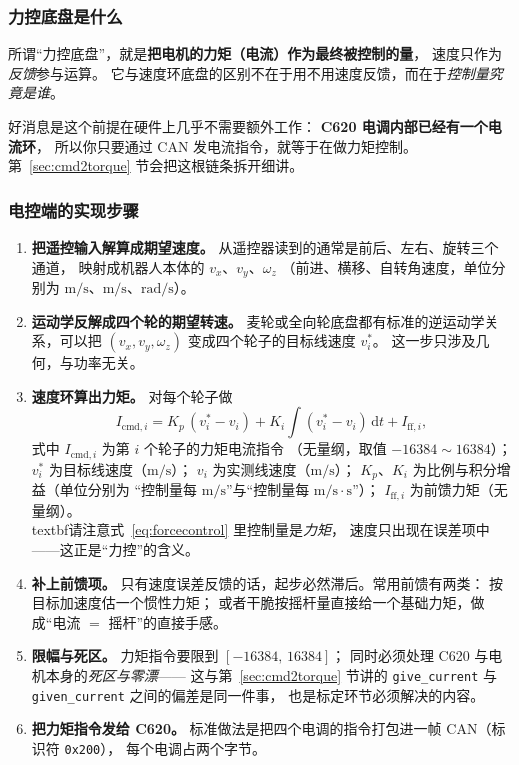 \documentclass[cn,blue,11pt,device=normal]{elegantnote}
\begin{document}
\subsubsection{力控底盘是什么}

所谓“力控底盘”，就是\textbf{把电机的力矩（电流）作为最终被控制的量}，
速度只作为\emph{反馈}参与运算。
它与速度环底盘的区别不在于用不用速度反馈，而在于\emph{控制量究竟是谁}。

好消息是这个前提在硬件上几乎不需要额外工作：
\textbf{C620 电调内部已经有一个电流环}，
所以你只要通过 CAN 发电流指令，就等于在做力矩控制。
第~\ref{sec:cmd2torque} 节会把这根链条拆开细讲。

\subsubsection{电控端的实现步骤}

\begin{enumerate}
  \item \textbf{把遥控输入解算成期望速度。}
  从遥控器读到的通常是前后、左右、旋转三个通道，
  映射成机器人本体的 $v_x$、$v_y$、$\omega_z$
  （前进、横移、自转角速度，单位分别为 $\mathrm{m/s}$、$\mathrm{m/s}$、$\mathrm{rad/s}$）。
  \item \textbf{运动学反解成四个轮的期望转速。}
  麦轮或全向轮底盘都有标准的逆运动学关系，可以把
  $(v_x,v_y,\omega_z)$ 变成四个轮子的目标线速度 $v_i^{\ast}$。
  这一步只涉及几何，与功率无关。
  \item \textbf{速度环算出力矩。}
  对每个轮子做
  \begin{equation}\label{eq:forcecontrol}
    I_{\mathrm{cmd},i} = K_p\,(v_i^{\ast}-v_i)
      + K_i\!\int (v_i^{\ast}-v_i)\,\mathrm{d}t + I_{\mathrm{ff},i},
  \end{equation}
  式中 $I_{\mathrm{cmd},i}$ 为第 $i$ 个轮子的力矩电流指令
  （无量纲，取值 $-16384\sim16384$）；
  $v_i^{\ast}$ 为目标线速度（$\mathrm{m/s}$）；
  $v_i$ 为实测线速度（$\mathrm{m/s}$）；
  $K_p$、$K_i$ 为比例与积分增益（单位分别为
  “控制量每 $\mathrm{m/s}$”与“控制量每 $\mathrm{m/s}\cdot\mathrm{s}$”）；
  $I_{\mathrm{ff},i}$ 为前馈力矩（无量纲）。
  \\textbf{请注意式~\eqref{eq:forcecontrol} 里控制量是\emph{力矩}，
  速度只出现在误差项中}——这正是“力控”的含义。
  \item \textbf{补上前馈项。}
  只有速度误差反馈的话，起步必然滞后。常用前馈有两类：
  按目标加速度估一个惯性力矩；
  或者干脆按摇杆量直接给一个基础力矩，做成“电流 $=$ 摇杆”的直接手感。
  \item \textbf{限幅与死区。}
  力矩指令要限到 $[-16384,\,16384]$；
  同时必须处理 C620 与电机本身的\emph{死区与零漂}——
  这与第~\ref{sec:cmd2torque} 节讲的 \texttt{give\_current} 与
  \texttt{given\_current} 之间的偏差是同一件事，
  也是标定环节必须解决的内容。
  \item \textbf{把力矩指令发给 C620。}
  标准做法是把四个电调的指令打包进一帧 CAN（标识符 \texttt{0x200}），
  每个电调占两个字节。
\end{enumerate}
\end{document}
